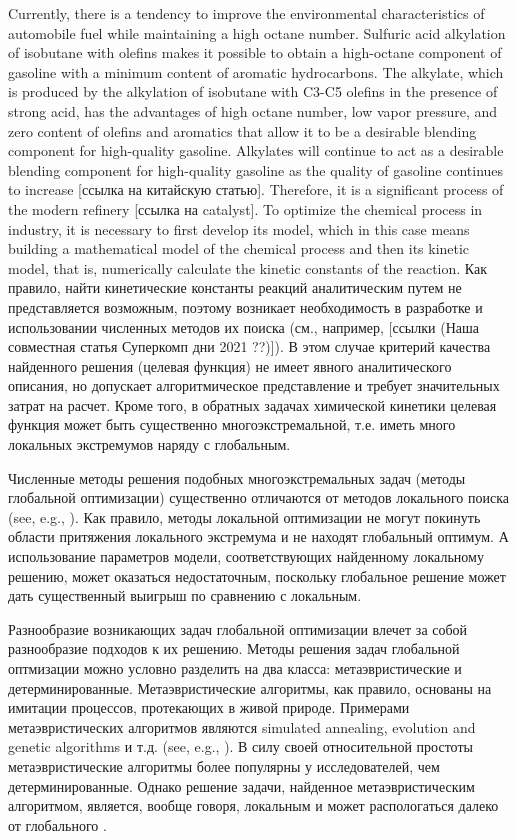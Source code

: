 \documentclass{svproc}
\begin{document}
Currently, there is a tendency to improve the environmental characteristics of automobile fuel while maintaining a high octane number. Sulfuric acid alkylation of isobutane with olefins makes it possible to obtain a high-octane component of gasoline with a minimum content of aromatic hydrocarbons. The alkylate, which is produced by the alkylation of isobutane with C3-C5 olefins in the presence of strong acid, has the advantages of high octane number, low vapor pressure, and zero content of olefins and aromatics that allow it to be a desirable blending component for high-quality gasoline. Alkylates will continue to act as a desirable blending component for high-quality gasoline as the quality of gasoline continues to increase [ссылка на китайскую статью]. Therefore, it is a significant process of the modern refinery [ссылка на catalyst]. To optimize the chemical process in industry, it is necessary to first develop its model, which in this case means building a mathematical model of the chemical process and then its kinetic model, that is, numerically calculate the kinetic constants of the reaction. 
Как правило, найти кинетические константы реакций аналитическим путем не представляется возможным, поэтому возникает необходимость в разработке и использовании численных методов их поиска (см., например, [ссылки (Наша совместная статья Суперкомп дни 2021 ??)]). В этом случае критерий качества найденного решения (целевая функция) не имеет явного аналитического описания, но допускает алгоритмическое представление и требует значительных затрат на расчет. Кроме того, в обратных задачах химической кинетики целевая функция может быть существенно многоэкстремальной, т.е. иметь много локальных экстремумов наряду с глобальным. 

Численные методы решения подобных многоэкстремальных задач (методы глобальной оптимизации) существенно отличаются от методов локального поиска (see, e.g., \cite{Sergeyev2017,PaulaviciusZilinskas2014}). Как правило, методы локальной оптимизации не могут покинуть области притяжения локального экстремума и не находят глобальный оптимум. А использование параметров модели, соответствующих найденному локальному решению, может оказаться недостаточным, поскольку глобальное решение может дать существенный выигрыш по сравнению с локальным. 

Разнообразие возникающих задач глобальной оптимизации влечет за собой разнообразие подходов к их решению.
Методы решения задач глобальной оптмизации можно условно разделить на два класса: метаэвристические и детерминированные. Метаэвристические алгоритмы, как правило, основаны на имитации процессов, протекающих в живой природе.
Примерами метаэвристических алгоритмов являются simulated annealing, evolution and genetic algorithms и т.д. (see, e.g., \cite{Battiti2009,Eiben2015}). В силу своей относительной простоты метаэвристические алгоритмы более популярны у исследователей, чем детерминированные.  Однако решение задачи, найденное метаэвристическим алгоритмом, является, вообще говоря, локальным и может распологаться далеко от глобального \cite{Kvasov2018}. 
\end{document}

